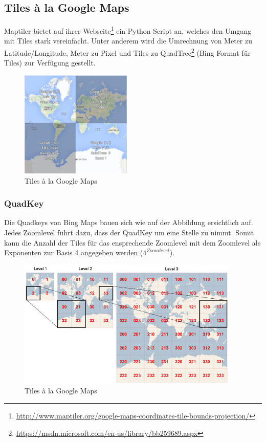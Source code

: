 \subsection{Tiles à la Google Maps}
Maptiler bietet auf ihrer Webseite\footnote{\url{http://www.maptiler.org/google-maps-coordinates-tile-bounds-projection/}} ein Python Script an, welches den Umgang mit Tiles stark vereinfacht. Unter anderem wird die Umrechnung von Meter zu Latitude/Longitude, Meter zu Pixel und Tiles zu QuadTree\footnote{\url{https://msdn.microsoft.com/en-us/library/bb259689.aspx}} (Bing Format für Tiles) zur Verfügung gestellt.

\begin{figure}[H]
\centering
\includegraphics[width=150pt]{images/tiles_a_la_google.png}
\caption[Tiles à la Google Maps]{Tiles à la Google Maps}
\end{figure}

\subsubsection{QuadKey}
Die Quadkeys von Bing Maps bauen sich wie auf der Abbildung ersichtlich auf. Jedes Zoomlevel führt dazu, dass der QuadKey um eine Stelle zu nimmt. Somit kann die Anzahl der Tiles für das ensprechende Zoomlevel mit dem Zoomlevel als Exponenten zur Basis 4 angegeben werden ($4^{Zoomlevel}$).  
\begin{figure}[H]
\centering
\includegraphics[width=300pt]{images/quadkey.png}
\caption[Tiles à la Google Maps]{Tiles à la Google Maps}
\end{figure}

